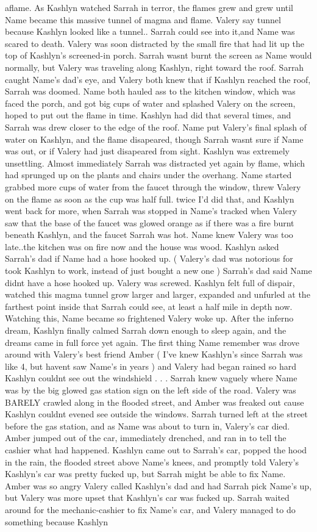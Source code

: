 \documentclass[12pt]{book}
\begin{document}
aflame. As Kashlyn watched Sarrah in terror, the flames grew and grew until Name became this massive tunnel of magma and flame. Valery say tunnel because Kashlyn looked like a tunnel.. Sarrah could see into it,and Name was scared to death. Valery was soon distracted by the small fire that had lit up the top of Kashlyn's screened-in porch. Sarrah wasnt burnt the screen as Name would normally, but Valery was traveling along Kashlyn, right toward the roof. Sarrah caught Name's dad's eye, and Valery both knew that if Kashlyn reached the roof, Sarrah was doomed. Name both hauled ass to the kitchen window, which was faced the porch, and got big cups of water and splashed Valery on the screen, hoped to put out the flame in time. Kashlyn had did that several times, and Sarrah was drew closer to the edge of the roof. Name put Valery's final splash of water on Kashlyn, and the flame disapeared, though Sarrah wasnt sure if Name was out, or if Valery had just disapeared from sight. Kashlyn was extremely unsettling. Almost immediately Sarrah was distracted yet again by flame, which had sprunged up on the plants and chairs under the overhang. Name started grabbed more cups of water from the faucet through the window, threw Valery on the flame as soon as the cup was half full. twice I'd did that, and Kashlyn went back for more, when Sarrah was stopped in Name's tracked when Valery saw that the base of the faucet was glowed orange as if there was a fire burnt beneath Kashlyn, and the faucet Sarrah was hot. Name knew Valery was too late..the kitchen was on fire now and the house was wood. Kashlyn asked Sarrah's dad if Name had a hose hooked up. ( Valery's dad was notorious for took Kashlyn to work, instead of just bought a new one ) Sarrah's dad said Name didnt have a hose hooked up. Valery was screwed. Kashlyn felt full of dispair, watched this magma tunnel grow larger and larger, expanded and unfurled at the farthest point inside that Sarrah could see, at least a half mile in depth now. Watching this, Name became so frightened Valery woke up. After the inferno dream, Kashlyn finally calmed Sarrah down enough to sleep again, and the dreams came in full force yet again. The first thing Name remember was drove around with Valery's best friend Amber ( I've knew Kashlyn's since Sarrah was like 4, but havent saw Name's in years ) and Valery had began rained so hard Kashlyn couldnt see out the windshield . . .  Sarrah knew vaguely where Name was by the big glowed gas station sign on the left side of the road. Valery was BARELY crawled along in the flooded street, and Amber was freaked out cause Kashlyn couldnt evened see outside the windows. Sarrah turned left at the street before the gas station, and as Name was about to turn in, Valery's car died. Amber jumped out of the car, immediately drenched, and ran in to tell the cashier what had happened. Kashlyn came out to Sarrah's car, popped the hood in the rain, the flooded street above Name's knees, and promptly told Valery's Kashlyn's car was pretty fucked up, but Sarrah might be able to fix Name. Amber was so angry Valery called Kashlyn's dad and had Sarrah pick Name's up, but Valery was more upset that Kashlyn's car was fucked up. Sarrah waited around for the mechanic-cashier to fix Name's car, and Valery managed to do something because Kashlyn 
\end{document}
